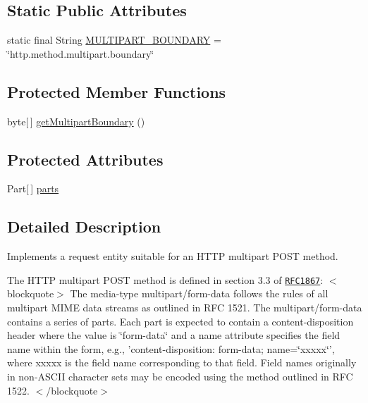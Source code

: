 \subsection*{Static Public Attributes}
\begin{DoxyCompactItemize}
\item 
static final String \hyperlink{classcom_1_1bluevia_1_1commons_1_1connector_1_1http_1_1multipart_1_1MultipartEntity_a333f6a62bf491dff95937cd562a25cd4}{MULTIPART\_\-BOUNDARY} = \char`\"{}http.method.multipart.boundary\char`\"{}
\end{DoxyCompactItemize}
\subsection*{Protected Member Functions}
\begin{DoxyCompactItemize}
\item 
byte\mbox{[}$\,$\mbox{]} \hyperlink{classcom_1_1bluevia_1_1commons_1_1connector_1_1http_1_1multipart_1_1MultipartEntity_afe91439ac03108baaf8aadebd8337ad1}{getMultipartBoundary} ()
\end{DoxyCompactItemize}
\subsection*{Protected Attributes}
\begin{DoxyCompactItemize}
\item 
Part\mbox{[}$\,$\mbox{]} \hyperlink{classcom_1_1bluevia_1_1commons_1_1connector_1_1http_1_1multipart_1_1MultipartEntity_a57c7f88c9eb78f75b17addf1aa7fa891}{parts}
\end{DoxyCompactItemize}


\subsection{Detailed Description}
Implements a request entity suitable for an HTTP multipart POST method. 

The HTTP multipart POST method is defined in section 3.3 of \href{http://www.ietf.org/rfc/rfc1867.txt}{\tt RFC1867}: $<$blockquote$>$ The media-\/type multipart/form-\/data follows the rules of all multipart MIME data streams as outlined in RFC 1521. The multipart/form-\/data contains a series of parts. Each part is expected to contain a content-\/disposition header where the value is \char`\"{}form-\/data\char`\"{} and a name attribute specifies the field name within the form, e.g., 'content-\/disposition: form-\/data; name=\char`\"{}xxxxx\char`\"{}', where xxxxx is the field name corresponding to that field. Field names originally in non-\/ASCII character sets may be encoded using the method outlined in RFC 1522. $<$/blockquote$>$  

